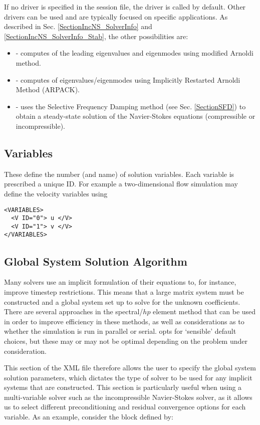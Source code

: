 If no driver is specified in the session file, the driver  is 
called by default. Other drivers can be used and are typically focused on
specific applications. As described in Sec.
\ref{SectionIncNS_SolverInfo} and  \ref{SectionIncNS_SolverInfo_Stab}, 
the other possibilities are:
\begin{itemize}
\item {}  - computes of the leading eigenvalues and 
eigenmodes using modified Arnoldi method.
\item {} - computes of eigenvalues/eigenmodes using Implicitly 
Restarted Arnoldi Method (ARPACK).
\item {} - uses the Selective Frequency Damping method 
(see Sec. \ref{SectionSFD}) to obtain a steady-state solution of the 
Navier-Stokes equations (compressible or incompressible).
\end{itemize}


\subsection{Variables}

These define the number (and name) of solution variables. Each variable is
prescribed a unique ID. For example a two-dimensional flow simulation may define
the velocity variables using

\begin{lstlisting}[style=XMLStyle]
<VARIABLES>
  <V ID="0"> u </V>
  <V ID="1"> v </V>
</VARIABLES>
\end{lstlisting}

\subsection{Global System Solution Algorithm}

Many \nekpp solvers use an implicit formulation of their equations to, for
instance, improve timestep restrictions. This means that a large matrix system
must be constructed and a global system set up to solve for the unknown
coefficients. There are several approaches in the spectral/$hp$ element method
that can be used in order to improve efficiency in these methods, as well as
considerations as to whether the simulation is run in parallel or serial. \nekpp
opts for `sensible' default choices, but these may or may not be optimal
depending on the problem under consideration.

This section of the XML file therefore allows the user to specify the global
system solution parameters, which dictates the type of solver to be used for any
implicit systems that are constructed. This section is particularly useful when
using a multi-variable solver such as the incompressible Navier-Stokes solver,
as it allows us to select different preconditioning and residual convergence
options for each variable. As an example, consider the block defined by:


